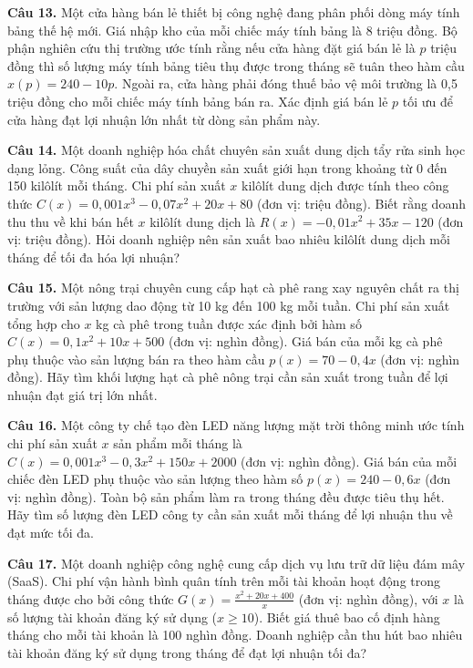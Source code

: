 \documentclass[12pt]{article}
\begin{document}
	\vspace{0.6cm}
	\noindent \textbf{Câu 13.} Một cửa hàng bán lẻ thiết bị công nghệ đang phân phối dòng máy tính bảng thế hệ mới. Giá nhập kho của mỗi chiếc máy tính bảng là 8 triệu đồng. Bộ phận nghiên cứu thị trường ước tính rằng nếu cửa hàng đặt giá bán lẻ là $p$ triệu đồng thì số lượng máy tính bảng tiêu thụ được trong tháng sẽ tuân theo hàm cầu $x(p) = 240 - 10p$. Ngoài ra, cửa hàng phải đóng thuế bảo vệ môi trường là 0,5 triệu đồng cho mỗi chiếc máy tính bảng bán ra. Xác định giá bán lẻ $p$ tối ưu để cửa hàng đạt lợi nhuận lớn nhất từ dòng sản phẩm này.
	
	\vspace{0.6cm}
	\noindent \textbf{Câu 14.} Một doanh nghiệp hóa chất chuyên sản xuất dung dịch tẩy rửa sinh học dạng lỏng. Công suất của dây chuyền sản xuất giới hạn trong khoảng từ 0 đến 150 kilôlít mỗi tháng. Chi phí sản xuất $x$ kilôlít dung dịch được tính theo công thức $C(x) = 0,001x^3 - 0,07x^2 + 20x + 80$ (đơn vị: triệu đồng). Biết rằng doanh thu thu về khi bán hết $x$ kilôlít dung dịch là $R(x) = -0,01x^2 + 35x - 120$ (đơn vị: triệu đồng). Hỏi doanh nghiệp nên sản xuất bao nhiêu kilôlít dung dịch mỗi tháng để tối đa hóa lợi nhuận?
	
	\vspace{0.6cm}
	\noindent \textbf{Câu 15.} Một nông trại chuyên cung cấp hạt cà phê rang xay nguyên chất ra thị trường với sản lượng dao động từ 10 kg đến 100 kg mỗi tuần. Chi phí sản xuất tổng hợp cho $x$ kg cà phê trong tuần được xác định bởi hàm số $C(x) = 0,1x^2 + 10x + 500$ (đơn vị: nghìn đồng). Giá bán của mỗi kg cà phê phụ thuộc vào sản lượng bán ra theo hàm cầu $p(x) = 70 - 0,4x$ (đơn vị: nghìn đồng). Hãy tìm khối lượng hạt cà phê nông trại cần sản xuất trong tuần để lợi nhuận đạt giá trị lớn nhất.
	
	\vspace{0.6cm}
	\noindent \textbf{Câu 16.} Một công ty chế tạo đèn LED năng lượng mặt trời thông minh ước tính chi phí sản xuất $x$ sản phẩm mỗi tháng là $C(x) = 0,001x^3 - 0,3x^2 + 150x + 2000$ (đơn vị: nghìn đồng). Giá bán của mỗi chiếc đèn LED phụ thuộc vào sản lượng theo hàm số $p(x) = 240 - 0,6x$ (đơn vị: nghìn đồng). Toàn bộ sản phẩm làm ra trong tháng đều được tiêu thụ hết. Hãy tìm số lượng đèn LED công ty cần sản xuất mỗi tháng để lợi nhuận thu về đạt mức tối đa.
	
	\vspace{0.6cm}
	\noindent \textbf{Câu 17.} Một doanh nghiệp công nghệ cung cấp dịch vụ lưu trữ dữ liệu đám mây (SaaS). Chi phí vận hành bình quân tính trên mỗi tài khoản hoạt động trong tháng được cho bởi công thức $G(x) = \frac{x^2 + 20x + 400}{x}$ (đơn vị: nghìn đồng), với $x$ là số lượng tài khoản đăng ký sử dụng ($x \ge 10$). Biết giá thuê bao cố định hàng tháng cho mỗi tài khoản là 100 nghìn đồng. Doanh nghiệp cần thu hút bao nhiêu tài khoản đăng ký sử dụng trong tháng để đạt lợi nhuận tối đa?
	
\end{document}
